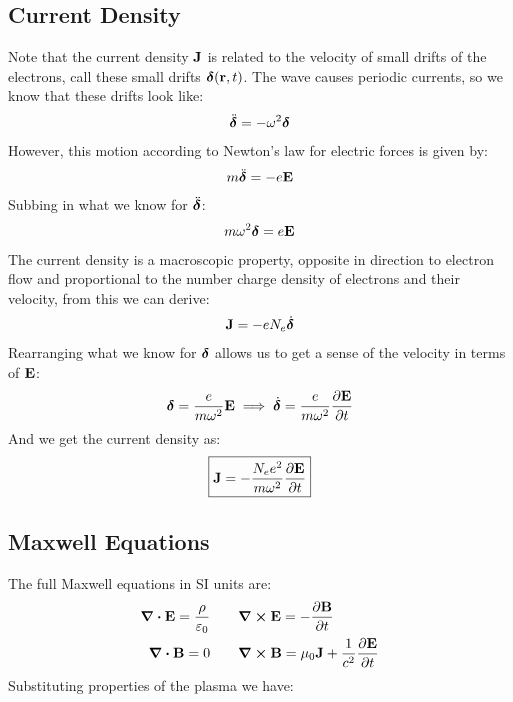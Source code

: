 \subsection{Current Density}
Note that the current density $\vb{J}$ is related to the velocity of small drifts of the electrons, call these small drifts $\bm{\delta}(\vb{r},t)$. The wave causes periodic currents, so we know that these drifts look like:
\begin{align*}
  \ddot{\bm{\delta}}=-\omega^2\bm{\delta}
\end{align*}
However, this motion according to Newton's law for electric forces is given by:
\begin{align*}
  m\ddot{\bm{\delta}}=-e\vb{E}
\end{align*}
Subbing in what we know for $\ddot{\bm{\delta}}$:
\begin{align*}
  m\omega^2\bm{\delta}=e\vb{E}
\end{align*}
The current density is a macroscopic property, opposite in direction to electron flow and proportional to the number charge density of electrons and their velocity, from this we can derive:
\begin{align*}
  \vb{J}=-eN_e\dot{\bm{\delta}}
\end{align*}
Rearranging what we know for $\bm{\delta}$ allows us to get a sense of the velocity in terms of $\vb{E}$:
\begin{align*}
  \bm{\delta}=\frac{e}{m\omega^2}\vb{E}\implies
  \dot{\bm{\delta}}=\frac{e}{m\omega^2}\pdv{\vb{E}}{t}
\end{align*}
And we get the current density as:
\begin{align}
  \boxed{\vb{J}=-\frac{N_ee^2}{m\omega^2}\pdv{\vb{E}}{t}}
\end{align}

\subsection{Maxwell Equations}
The full Maxwell equations in SI units are:
\begin{align*}
  \div{\vb{E}}=\frac{\rho}{\varepsilon_0} \quad&\quad
  \curl{\vb{E}}=-\pdv{\vb{B}}{t}\\
  \div{\vb{B}}=0 \quad&\quad
  \curl{\vb{B}}=\mu_0\vb{J}+\frac1{c^2}\pdv{\vb{E}}{t}
\end{align*}
Substituting properties of the plasma we have:

